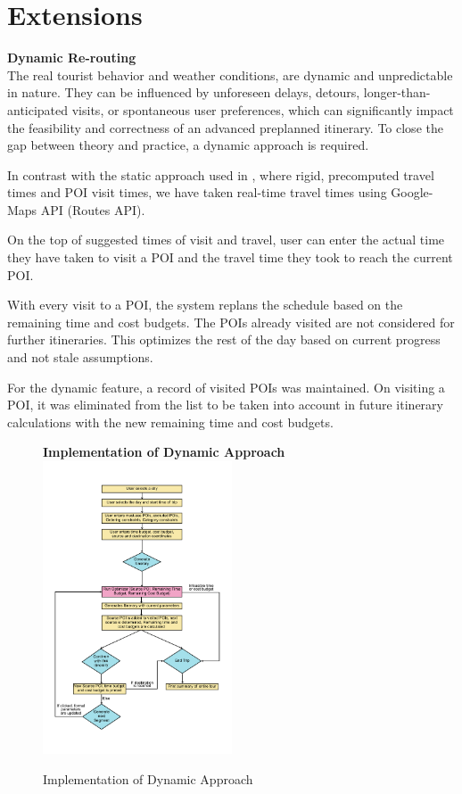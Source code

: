 \section{Extensions}

\textbf{Dynamic Re-routing}\\
The real tourist behavior and weather conditions, are dynamic and unpredictable in nature. They can be influenced by unforeseen delays, detours, longer-than-anticipated visits, or spontaneous user preferences, which can significantly impact the feasibility and correctness of an advanced preplanned itinerary. To close the gap between theory and practice, a dynamic approach is required.

In contrast with the static approach used in \cite{taylor2018tour}, where rigid, precomputed travel times and POI visit times, we have taken real-time travel times using Google-Maps API (Routes API). 

On the top of suggested times of visit and travel, user can enter the actual time they have taken to visit a POI and the travel time they took to reach the current POI.

With every visit to a POI, the system replans the schedule based on the remaining time and cost budgets. The POIs already visited are not considered for further itineraries. This optimizes the rest of the day based on current progress and not stale assumptions.

For the dynamic feature, a record of visited POIs was maintained. On visiting a POI, it was eliminated from the list to be taken into account in future itinerary calculations with the new remaining time and cost budgets.

\begin{figure}[H]
\textbf{Implementation of Dynamic Approach}
\centering
\includegraphics[width=0.5\textwidth]{binary dynamic flowchart.png}
\caption{Implementation of Dynamic Approach}
\label{fig:flowchart_dynamic}
\end{figure}

